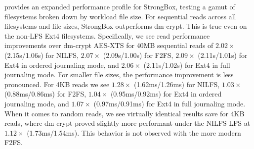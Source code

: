  provides an expanded performance profile for
StrongBox, testing a gamut of filesystems broken down by workload file size. For
sequential reads across all filesystems and file sizes, StrongBox outperforms
dm-crypt. This is true even on the non-LFS Ext4 filesystems. Specifically, we
see read performance improvements over dm-crypt AES-XTS for 40MB sequential
reads of $2.02\times$ (2.15s/1.06s) for NILFS, $2.07\times$ (2.09s/1.00s) for
F2FS, $2.09\times$ (2.11s/1.01s) for Ext4 in ordered journaling mode, and
$2.06\times$ (2.11s/1.02s) for Ext4 in full journaling mode. For smaller file
sizes, the performance improvement is less pronounced. For 4KB reads we see
$1.28\times$ (1.62ms/1.26ms) for NILFS, $1.03\times$ (0.88ms/0.86ms) for F2FS,
$1.04\times$ (0.95ms/0.92ms) for Ext4 in ordered journaling mode, and
$1.07\times$ (0.97ms/0.91ms) for Ext4 in full journaling mode. When it comes to
random reads, we see virtually identical results save for 4KB reads, where
dm-crypt proved slightly more performant under the NILFS LFS at $1.12\times$
(1.73ms/1.54ms). This behavior is not observed with the more modern F2FS\@.


